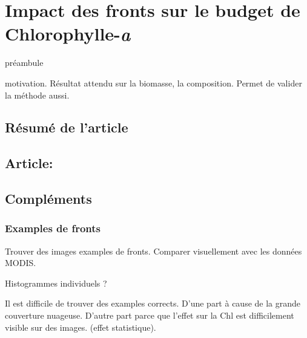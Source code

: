 \documentclass[master]{subfiles}
\begin{document}
\chapter{Impact des fronts sur le budget de Chlorophylle-\emph{a}}
\label{chp:res-chl}

\tocsubfile%

préambule

motivation.
Résultat attendu sur la biomasse, la composition.
Permet de valider la méthode aussi.

\section{Résumé de l'article}
\label{sec:resume-article}

\section[Article]{Article: \articleTitle{}}
\label{sec:article-bg}

\section{Compléments}
\label{sec:complements-chl}

\subsection{Examples de fronts}
\label{sec:examples-fronts}

Trouver des images examples de fronts.
Comparer visuellement avec les données MODIS.

Histogrammes individuels ?

Il est difficile de trouver des examples corrects.
D'une part à cause de la grande couverture nuageuse.
D'autre part parce que l'effet sur la Chl est difficilement visible sur des images. (effet statistique).
\end{document}
